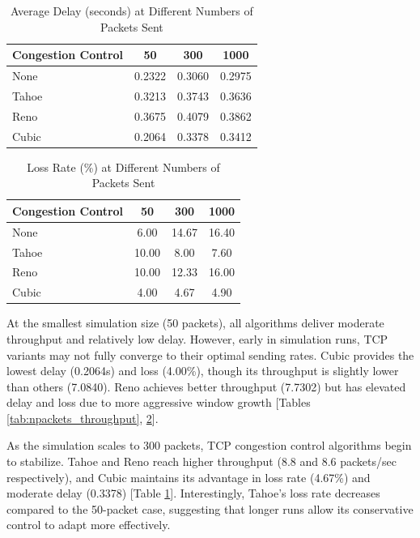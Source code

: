 \documentclass[conference]{IEEEtran}
\begin{document}
\begin{table}[h!]
    \centering
    \caption{Average Delay (seconds) at Different Numbers of Packets Sent}
    \begin{tabular}{lccc}
    \toprule
    \textbf{Congestion Control} & \textbf{50} & \textbf{300} & \textbf{1000} \\
    \midrule
    None  & 0.2322 & 0.3060 & 0.2975 \\
    Tahoe & 0.3213 & 0.3743 & 0.3636 \\
    Reno  & 0.3675 & 0.4079 & 0.3862 \\
    Cubic & 0.2064 & 0.3378 & 0.3412 \\
    \bottomrule
    \end{tabular}
    \label{tab:npackets_avg_delay}
\end{table}

\begin{table}[h!]
    \centering
    \caption{Loss Rate (\%) at Different Numbers of Packets Sent}
    \begin{tabular}{lccc}
    \toprule
    \textbf{Congestion Control} & \textbf{50} & \textbf{300} & \textbf{1000} \\
    \midrule
    None  & 6.00  & 14.67 & 16.40 \\
    Tahoe & 10.00 & 8.00  & 7.60  \\
    Reno  & 10.00 & 12.33 & 16.00 \\
    Cubic & 4.00  & 4.67  & 4.90  \\
    \bottomrule
    \end{tabular}
    \label{tab:npackets_loss_rate}
\end{table}

At the smallest simulation size (50 packets), all algorithms deliver moderate throughput and relatively low delay. 
However, early in simulation runs, TCP variants may not fully converge to their optimal sending rates. 
Cubic provides the lowest delay (0.2064s) and loss (4.00\%), though its throughput is slightly lower than others (7.0840). 
Reno achieves better throughput (7.7302) but has elevated delay and loss due to more aggressive window growth [Tables \ref{tab:npackets_throughput}, \ref{tab:npackets_loss_rate}].

As the simulation scales to 300 packets, TCP congestion control algorithms begin to stabilize. 
Tahoe and Reno reach higher throughput (8.8 and 8.6 packets/sec respectively), and Cubic maintains its advantage in loss rate (4.67\%) and moderate delay (0.3378) [Table \ref{tab:npackets_avg_delay}]. 
Interestingly, Tahoe’s loss rate decreases compared to the 50-packet case, suggesting that longer runs allow its conservative control to adapt more effectively.
\end{document}
